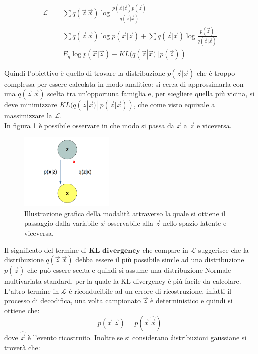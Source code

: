 \begin{equation}
\label{eq:lower_bound}
\begin{split}
	\mathcal{L} &= \sum q(\vec{z}|\vec{x}) \log \frac{p(\vec{x}|\vec{z})p(\vec{z})}{q(\vec{z}|\vec{x})} \\
	 &=\sum q(\vec{z}|\vec{x}) \log p(\vec{x}|\vec{z}) + \sum q(\vec{z}|\vec{x}) \log \frac{p(\vec{z})}{q(\vec{z}|\vec{x})} \\
	  &= E_{q}\log p(\vec{x}|\vec{z}) - KL (q(\vec{z}|\vec{x}) || p(\vec{z}))
\end{split}
\end{equation}

Quindi l'obiettivo è quello di trovare la distribuzione $p(\vec{z}|\vec{x})$ che è troppo complessa per essere calcolata in modo analitico: si cerca di approssimarla con una $q(\vec{z}|\vec{x})$ scelta tra un'opportuna famiglia e, per scegliere quella più vicina, si deve minimizzare $KL (q(\vec{z}|\vec{x}) || p(\vec{z}|\vec{x}))$, che come visto equivale a massimizzare la $\mathcal{L}$. \\
In figura \ref{grafo} è possibile osservare in che modo si passa da $\vec{x}$ a $\vec{z}$ e viceversa.

\newpage

\begin{figure}[h!]
	\centering		\includegraphics[width=0.40\textwidth]{figs/grafoVAE.png}
	\caption{Illustrazione grafica della modalità attraverso la quale si ottiene il passaggio dalla variabile $\vec{x}$ osservabile alla $\vec{z}$ nello spazio latente e viceversa.}
	\label{grafo}
\end{figure}

Il significato del termine di $\textbf{KL divergency}$ che compare in $\mathcal{L}$ suggerisce che la distribuzione $q(\vec{z}|\vec{x})$ debba essere il più possibile simile ad una distribuzione $p(\vec{z})$ che può essere scelta e quindi si assume una distribuzione Normale multivariata standard, per la quale la KL divergency è più facile da calcolare. \\
L'altro termine in $\mathcal{L}$ è riconducibile ad un errore di ricostruzione, infatti il processo di decodifica, una volta campionato $\vec{z}$ è deterministico e quindi si ottiene che:
\begin{equation}
	p(\vec{x}|\vec{z}) = p(\vec{x}|\hat{\vec{x}})
\end{equation}
dove $\hat{\vec{x}}$ è l'evento ricostruito. Inoltre se si considerano distribuzioni gaussiane si troverà che:

